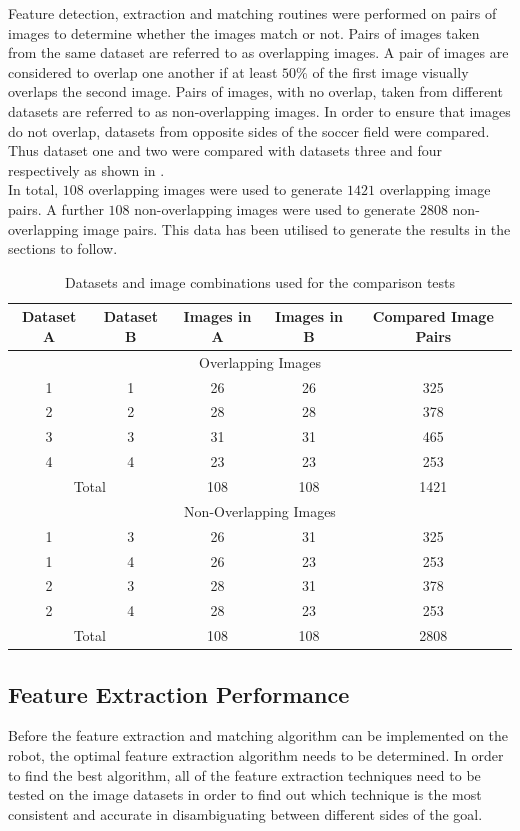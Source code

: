 \documentclass{article}
\begin{document}
Feature detection, extraction and matching routines were performed on pairs of images to determine whether the images match or not. Pairs of images taken from the same dataset are referred to as overlapping images. A pair of images are considered to overlap one another if at least $50\%$ of the first image visually overlaps the second image. Pairs of images, with no overlap, taken from different datasets are referred to as non-overlapping images. In order to ensure that images do not overlap, datasets from opposite sides of the soccer field were compared. Thus dataset one and two were compared with datasets three and four respectively as shown in . \\

In total, $108$ overlapping images were used to generate $1421$ overlapping image pairs. A further $108$ non-overlapping images were used to generate $2808$ non-overlapping image pairs. This data has been utilised to generate the results in the sections to follow. \\ 

\begin{table}
\caption{Datasets and image combinations used for the comparison tests}
\begin{tabular}{|c|c|c|c|c|}
\hline 
Dataset A & Dataset B & Images in A & Images in B & Compared Image Pairs\tabularnewline
\hline 
\hline 
\multicolumn{5}{|c}{Overlapping Images}\tabularnewline
\hline 
1 & 1 & 26 & 26 & 325\tabularnewline
\hline 
2 & 2 & 28 & 28 & 378\tabularnewline
\hline 
3 & 3 & 31 & 31 & 465\tabularnewline
\hline 
4 & 4 & 23 & 23 & 253\tabularnewline
\hline 
\multicolumn{2}{|c|}{Total} & 108 & 108 & 1421\tabularnewline
\hline 
\multicolumn{5}{|c}{Non-Overlapping Images}\tabularnewline
\hline 
1 & 3 & 26 & 31 & 325\tabularnewline
\hline 
1 & 4 & 26 & 23 & 253\tabularnewline
\hline 
2 & 3 & 28 & 31 & 378\tabularnewline
\hline 
2 & 4 & 28 & 23 & 253\tabularnewline
\hline 
\multicolumn{2}{|c|}{Total} & 108 & 108 & 2808\tabularnewline
\hline 
\end{tabular}
\label{table:overlap}
\end{table}

\subsection{Feature Extraction Performance}
\label{sec:featureExtraction}
Before the feature extraction and matching algorithm can be implemented on the robot, the optimal feature extraction algorithm needs to be determined. In order to find the best algorithm, all of the feature extraction techniques need to be tested on the image datasets in order to find out which technique is the most consistent and accurate in disambiguating between different sides of the goal. \\
\end{document}
